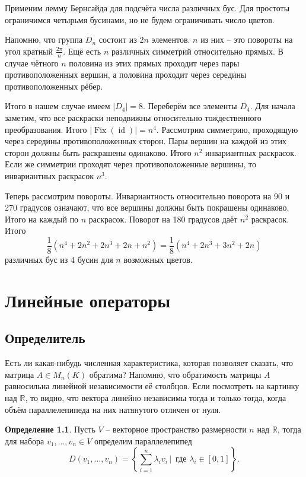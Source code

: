 \documentclass[10pt,a4paper,oneside]{book}
\theoremstyle{definition}
\newtheorem*{defn}{\color{yellow!30!red} Определение}
\newcommand{\mb}[1]{\mathbb{#1}}
\newcommand{\id}{\operatorname{id}}
\newcommand{\Fix}{\operatorname{Fix}}
\def\dfn{\begin{defn}}
\def\edfn{\end{defn}}
\begin{document}
Применим лемму Бернсайда для подсчёта числа различных бус. Для простоты ограничимся четырьмя бусинами, но не будем ограничивать число цветов. 

Напомню, что группа $D_n$ состоит из $2n$ элементов. $n$ из них -- это повороты на угол кратный $\frac{2\pi}{n}$. Ещё есть $n$ различных симметрий относительно прямых. В случае чётного $n$ половина из этих прямых проходит  через пары противоположенных вершин, а половина проходит через середины противоположенных рёбер. 

Итого в нашем случае имеем $|D_4|=8$. Переберём все элементы $D_4$. Для начала заметим, что все раскраски неподвижны относительно тождественного преобразования. Итого $|\Fix(\id)|=n^4$. Рассмотрим симметрию, проходящую через середины противоположенных сторон. Пары вершин на каждой из этих сторон должны быть раскрашены одинаково. Итого $n^2$ инвариантных раскрасок. Если же симметрии проходят через противоположенные вершины, то инвариантных раскрасок $n^3$. 

Теперь рассмотрим повороты. Инвариантность относительно поворота на 90  и 270 градусов означают, что все вершины должны быть покрашены одинаково. Итого на каждый по $n$ раскрасок. Поворот на 180 градусов даёт $n^2$ раскрасок. Итого
$$\frac{1}{8}(n^4+2n^2+2n^3+2n+n^2)=\frac{1}{8}(n^4+2n^3+3n^2+2n)$$
различных бус из 4 бусин для $n$ возможных цветов.


\chapter{Линейные операторы}



\section{Определитель}

Есть ли какая-нибудь численная характеристика, которая позволяет сказать, что матрица $A\in M_n(K)$ обратима? Напомню, что обратимость матрицы $A$ равносильна линейной независимости её столбцов. Если посмотреть на картинку над $\mb R$, то видно, что вектора линейно независимы тогда и только тогда, когда объём параллелепипеда на них натянутого отличен от нуля.

\dfn Пусть $V$ -- векторное пространство размерности $n$ над $\mb R$, тогда для набора  $v_1,\dots,v_n \in V$ определим параллелепипед
$$D(v_1,\dots,v_n)=\left\{\sum_{i=1}^n \lambda_i v_i\,|\, \text{ где } \lambda_i\in [0,1]\right\}.$$
\edfn
\end{document}
